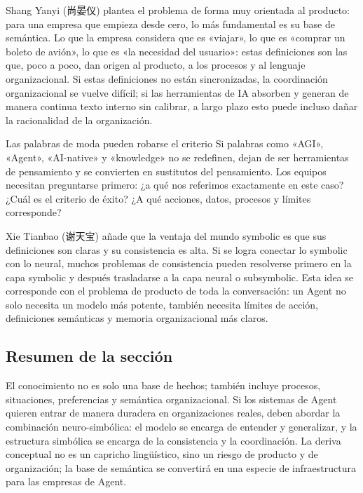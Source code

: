 Shang Yanyi (尚晏仪) plantea el problema de forma muy orientada al producto: para una empresa que empieza desde cero, lo más fundamental es su base de semántica. Lo que la empresa considera que es «viajar», lo que es «comprar un boleto de avión», lo que es «la necesidad del usuario»: estas definiciones son las que, poco a poco, dan origen al producto, a los procesos y al lenguaje organizacional. Si estas definiciones no están sincronizadas, la coordinación organizacional se vuelve difícil; si las herramientas de IA absorben y generan de manera continua texto interno sin calibrar, a largo plazo esto puede incluso dañar la racionalidad de la organización.

\begin{warningbox}{Las palabras de moda pueden robarse el criterio}
Si palabras como «AGI», «Agent», «AI-native» y «knowledge» no se redefinen, dejan de ser herramientas de pensamiento y se convierten en sustitutos del pensamiento. Los equipos necesitan preguntarse primero: ¿a qué nos referimos exactamente en este caso? ¿Cuál es el criterio de éxito? ¿A qué acciones, datos, procesos y límites corresponde?
\end{warningbox}

Xie Tianbao (谢天宝) añade que la ventaja del mundo symbolic es que sus definiciones son claras y su consistencia es alta. Si se logra conectar lo symbolic con lo neural, muchos problemas de consistencia pueden resolverse primero en la capa symbolic y después trasladarse a la capa neural o subsymbolic. Esta idea se corresponde con el problema de producto de toda la conversación: un Agent no solo necesita un modelo más potente, también necesita límites de acción, definiciones semánticas y memoria organizacional más claros.

\subsection{Resumen de la sección}

El conocimiento no es solo una base de hechos; también incluye procesos, situaciones, preferencias y semántica organizacional. Si los sistemas de Agent quieren entrar de manera duradera en organizaciones reales, deben abordar la combinación neuro-simbólica: el modelo se encarga de entender y generalizar, y la estructura simbólica se encarga de la consistencia y la coordinación. La deriva conceptual no es un capricho lingüístico, sino un riesgo de producto y de organización; la base de semántica se convertirá en una especie de infraestructura para las empresas de Agent.
